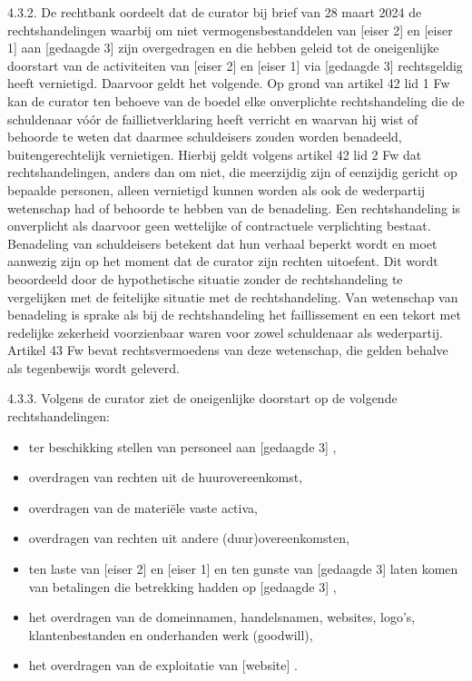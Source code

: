 \documentclass[
  dutch,
  a4paper,
]{article}
\begin{document}
4.3.2. De rechtbank oordeelt dat de curator bij brief van 28 maart 2024 de rechtshandelingen waarbij om niet vermogensbestanddelen van {[}eiser 2{]} en {[}eiser 1{]} aan {[}gedaagde 3{]} zijn overgedragen en die hebben geleid tot de oneigenlijke doorstart van de activiteiten van {[}eiser 2{]} en {[}eiser 1{]} via {[}gedaagde 3{]} rechtsgeldig heeft vernietigd. Daarvoor geldt het volgende. Op grond van artikel 42 lid 1 Fw kan de curator ten behoeve van de boedel elke onverplichte rechtshandeling die de schuldenaar vóór de faillietverklaring heeft verricht en waarvan hij wist of behoorde te weten dat daarmee schuldeisers zouden worden benadeeld, buitengerechtelijk vernietigen. Hierbij geldt volgens artikel 42 lid 2 Fw dat rechtshandelingen, anders dan om niet, die meerzijdig zijn of eenzijdig gericht op bepaalde personen, alleen vernietigd kunnen worden als ook de wederpartij wetenschap had of behoorde te hebben van de benadeling. Een rechtshandeling is onverplicht als daarvoor geen wettelijke of contractuele verplichting bestaat. Benadeling van schuldeisers betekent dat hun verhaal beperkt wordt en moet aanwezig zijn op het moment dat de curator zijn rechten uitoefent. Dit wordt beoordeeld door de hypothetische situatie zonder de rechtshandeling te vergelijken met de feitelijke situatie met de rechtshandeling. Van wetenschap van benadeling is sprake als bij de rechtshandeling het faillissement en een tekort met redelijke zekerheid voorzienbaar waren voor zowel schuldenaar als wederpartij. Artikel 43 Fw bevat rechtsvermoedens van deze wetenschap, die gelden behalve als tegenbewijs wordt geleverd.

4.3.3. Volgens de curator ziet de oneigenlijke doorstart op de volgende rechtshandelingen:

\begin{itemize}
\item
  ter beschikking stellen van personeel aan {[}gedaagde 3{]} ,
\item
  overdragen van rechten uit de huurovereenkomst,
\item
  overdragen van de materiële vaste activa,
\item
  overdragen van rechten uit andere (duur)overeenkomsten,
\item
  ten laste van {[}eiser 2{]} en {[}eiser 1{]} en ten gunste van {[}gedaagde 3{]} laten komen van betalingen die betrekking hadden op {[}gedaagde 3{]} ,
\item
  het overdragen van de domeinnamen, handelsnamen, websites, logo's, klantenbestanden en onderhanden werk (goodwill),
\item
  het overdragen van de exploitatie van {[}website{]} .
\end{itemize}
\end{document}
